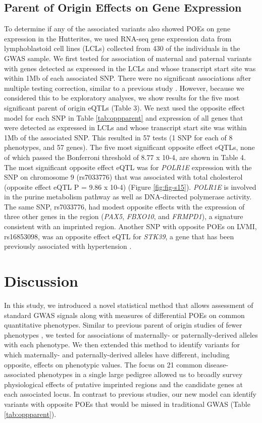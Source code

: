 \subsection{Parent of Origin Effects on Gene Expression}\label{Parent of Origin Effects on Gene Expression}

To determine if any of the associated variants also showed POEs on gene expression in the Hutterites, we used RNA-seq gene expression data from lymphoblastoid cell lines (LCLs) collected from 430 of the individuals in the GWAS sample. We first tested for association of maternal and paternal variants with genes detected as expressed in the LCLs and whose transcript start site was within 1Mb of each associated SNP. There were no significant associations after multiple testing correction, similar to a previous study \cite{Benonisdottir:2016dz}. However, because we considered this to be exploratory analyses, we show results for the five most significant parent of origin eQTLs (Table 3). We next used the opposite effect model for each SNP in Table \ref{tab:oppparent} and expression of all genes that were detected as expressed in LCLs and whose transcript start site was within 1Mb of the associated SNP. This resulted in 57 tests (1 SNP for each of 8 phenotypes, and 57 genes). The five most significant opposite effect eQTLs, none of which passed the Bonferroni threshold of 8.77 x 10-4, are shown in Table 4. The most significant opposite effect eQTL was for \emph{POLR1E} expression with the SNP on chromosome 9 (rs7033776) that was associated with total cholesterol (opposite effect eQTL P = 9.86 x 10-4) (Figure \ref{fig:fig-s15}). \emph{POLR1E} is involved in the purine metabolism pathway as well as DNA-directed polymerase activity. The same SNP, rs7033776, had modest opposite effects with the expression of three other genes in the region (\emph{PAX5}, \emph{FBXO10}, and \emph{FRMPD1}), a signature consistent with an imprinted region. Another SNP with opposite POEs on LVMI, rs16853098, was an opposite effect eQTL for \emph{STK39}, a gene that has been previously associated with hypertension \cite{Wang:2009bt}.


\section{Discussion}\label{ch02-discussion}

In this study, we introduced a novel statistical method that allows assessment of standard GWAS signals along with measures of differential POEs on common quantitative phenotypes. Similar to previous parent of origin studies of fewer phenotypes \cite{Kong:2009kk,Benonisdottir:2016dz,Garg2012a}, we tested for associations of maternally- or paternally-derived alleles with each phenotype. We then extended this method to identify variants for which maternally- and paternally-derived alleles have different, including opposite, effects on phenotypic values. The focus on 21 common disease-associated phenotypes in a single large pedigree allowed us to broadly survey physiological effects of putative imprinted regions and the candidate genes at each associated locus. In contrast to previous studies, our new model can identify variants with opposite POEs that would be missed in traditional GWAS (Table \ref{tab:oppparent}). 

